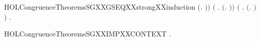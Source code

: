 \begin{SaveVerbatim}{HOLCongruenceTheoremsSGXXGSEQXXstrongXXinduction}
             \ensuremath{(}\HOLTokenLambda{}. \HOLConst{\ensuremath{\tau}}\HOLSymConst{\ensuremath{\ldotp}}  \HOLSymConst{\ensuremath{+}}  \HOLSymConst{\ensuremath{\ldotp}} \ensuremath{)}\ensuremath{)} \HOLSymConst{\HOLTokenConj{}}
       \ensuremath{(}\HOLSymConst{\HOLTokenForall{}}  .
              \HOLSymConst{\HOLTokenConj{}}   \HOLSymConst{\HOLTokenConj{}}   \HOLSymConst{\HOLTokenConj{}}   \HOLSymConst{\HOLTokenImp{}}
             \ensuremath{(}\HOLTokenLambda{}.  \HOLSymConst{\ensuremath{\ldotp}}  \HOLSymConst{\ensuremath{+}} \HOLConst{\ensuremath{\tau}}\HOLSymConst{\ensuremath{\ldotp}} \ensuremath{)}\ensuremath{)} \HOLSymConst{\HOLTokenConj{}}
       \ensuremath{(}\HOLSymConst{\HOLTokenForall{}}   .
              \HOLSymConst{\HOLTokenConj{}}   \HOLSymConst{\HOLTokenImp{}}
             \ensuremath{(}\HOLTokenLambda{}.  \HOLSymConst{\ensuremath{\ldotp}}  \HOLSymConst{\ensuremath{+}}  \HOLSymConst{\ensuremath{\ldotp}} \ensuremath{)}\ensuremath{)} \HOLSymConst{\HOLTokenImp{}}
       \HOLSymConst{\HOLTokenForall{}}.   \HOLSymConst{\HOLTokenConj{}}   \HOLSymConst{\HOLTokenImp{}}  
\end{SaveVerbatim}
\newcommand{\HOLCongruenceTheoremsSGXXGSEQXXstrongXXinduction}{\UseVerbatim{HOLCongruenceTheoremsSGXXGSEQXXstrongXXinduction}}
\begin{SaveVerbatim}{HOLCongruenceTheoremsSGXXIMPXXCONTEXT}
\HOLTokenTurnstile{} \HOLSymConst{\HOLTokenForall{}}.   \HOLSymConst{\HOLTokenImp{}}  
\end{SaveVerbatim}
